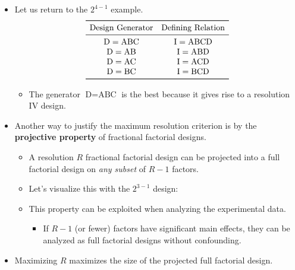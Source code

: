 \begin{itemize}
    \item Let us return to the $ 2^{4-1} $ example.
          \[ \begin{matrix}
                  \toprule
                  \text{Design Generator} & \text{Defining Relation} \\
                  \midrule
                  \text{D}=\text{ABC}     & \text{I}=\text{ABCD}     \\
                  \text{D}=\text{AB}      & \text{I}=\text{ABD}      \\
                  \text{D}=\text{AC}      & \text{I}=\text{ACD}      \\
                  \text{D}=\text{BC}      & \text{I}=\text{BCD}      \\
                  \bottomrule
              \end{matrix} \]
          \begin{itemize}[*]
              \item The generator $ \text{D}=\text{ABC} $ is the best because it gives rise to a resolution IV design.
          \end{itemize}
    \item Another way to justify the maximum resolution criterion is by the \textbf{projective property} of fractional
          factorial designs.
          \begin{itemize}[*]
              \item A resolution $R$ fractional factorial design can be projected into a full factorial design on \emph{any subset}
                    of $R-1$ factors.
          \end{itemize}
          \begin{itemize}
              \item Let's visualize this with the $ 2^{3-1} $ design:
              \item This property can be exploited when analyzing the experimental data.
                    \begin{itemize}[$\hookrightarrow$]
                        \item If $ R-1 $ (or fewer) factors have significant main effects, they can be analyzed as full factorial
                              designs without confounding.
                    \end{itemize}
          \end{itemize}
\end{itemize}
\begin{itemize}[*]
    \item Maximizing $R$ maximizes the size of the projected full factorial design.
\end{itemize}
